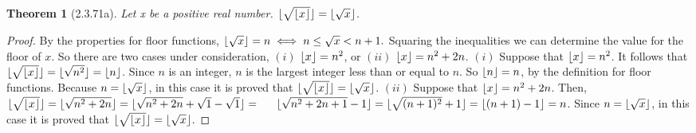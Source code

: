 \documentclass[a4paper, 12pt]{article}
\theoremstyle{plain}
\newtheorem*{theorem*}{Theorem}
\DeclarePairedDelimiter{\floor}{\lfloor}{\rfloor}
\begin{document}
	
	\begin{theorem*}[2.3.71a]
		Let x be a positive real number. $\floor{\sqrt{\floor{x}}} = \floor{\sqrt{x}}$.
	\end{theorem*}
	
	\begin{proof}
		By the properties for floor functions, \newline $\floor{\sqrt{x}} = n \iff n \le \sqrt{x} < n + 1.$ Squaring the inequalities we can determine the value for the floor of $x$. So there are two cases under consideration, \newline $(i)$ $\floor{x} = n^2$, or $(ii)$ $\floor{x} = n^{2} + 2n$.
		\newline
		\newline \indent
		$(i)$ Suppose that $\floor{x} = n^{2}$. It follows that $\floor{\sqrt{\floor{x}}} = \floor{\sqrt{n^2}} = \floor{n}$. \indent Since $n$ is an integer, $n$ is the largest integer less than or equal to $n$. So \indent $\floor{n} = n$, by the definition for floor functions. Because $n = \floor{\sqrt{x}}$, in this \indent case it is proved that $\floor{\sqrt{\floor{x}}} = \floor{\sqrt{x}}$.
		\newline
		\newline \indent
		$(ii)$ Suppose that $\floor{x} = n^{2} + 2n$. Then, \newline \indent $\floor{\sqrt{\floor{x}}} = \floor{\sqrt{n^{2} + 2n}} = \floor{\sqrt{n^2 + 2n} + \sqrt{1} - \sqrt{1}} = \newline \indent \floor{\sqrt{n^2 + 2n + 1} - 1} = \floor{\sqrt{(n+1)^2} + 1} = \floor{(n+1) -1} = n$. Since \indent $n = \floor{\sqrt{x}}$, in this case it is proved that $\floor{\sqrt{\floor{x}}} = \floor{\sqrt{x}}$.
	\end{proof}
\end{document}
